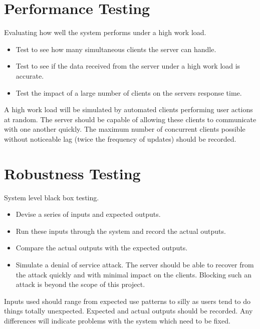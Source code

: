 \section{Performance Testing}
Evaluating how well the system performs under a high work load.
\begin{itemize}
\item Test to see how many simultaneous clients the server can handle.
\item Test to see if the data received from the server under a high work load is 
accurate.
\item Test the impact of a large number of clients on the servers response time.
\end{itemize}
A high work load will be simulated by automated clients performing user actions
at random. The server should be capable of allowing these clients to
communicate with one another quickly. The maximum number of concurrent clients 
possible without noticeable lag (twice the frequency of updates) should be
recorded.

\section{Robustness Testing}
System level black box testing.  
\begin{itemize}
\item Devise a series of inputs and expected outputs.
\item Run these inputs through the system and record the actual outputs.
\item Compare the actual outputs with the expected outputs.
\item Simulate a denial of service attack. The server should be able to recover
from the attack quickly and with minimal impact on the clients. Blocking such an
attack is beyond the scope of this project.
\end{itemize}
Inputs used should range from expected use patterns to silly as users tend to do 
things totally unexpected. Expected and actual outputs should be recorded. Any
differences will indicate problems with the system which need to be fixed.

